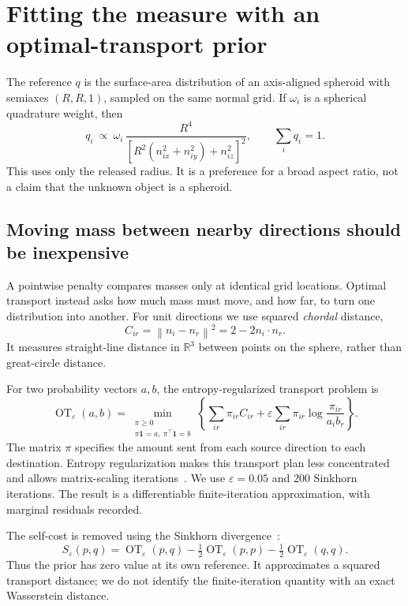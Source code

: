 \documentclass[11pt,a4paper]{article}
\newcommand{\R}{\mathbb{R}}
\newcommand{\norm}[1]{\left\lVert#1\right\rVert}
\newcommand{\OT}{\operatorname{OT}}
\begin{document}
\clearpage
\section{Fitting the measure with an optimal-transport prior}
The reference $q$ is the surface-area distribution of an axis-aligned spheroid with semiaxes $(R,R,1)$, sampled on the same normal grid. If $\omega_i$ is a spherical quadrature weight, then
\begin{equation}
 q_i\ \propto\ \omega_i\,
 \frac{R^4}{\left[R^2(n_{ix}^2+n_{iy}^2)+n_{iz}^2\right]^2},
 \qquad \sum_i q_i=1.\label{eq:reference}
\end{equation}
This uses only the released radius. It is a preference for a broad aspect ratio, not a claim that the unknown object is a spheroid.

\subsection*{Moving mass between nearby directions should be inexpensive}
A pointwise penalty compares masses only at identical grid locations. Optimal transport instead asks how much mass must move, and how far, to turn one distribution into another. For unit directions we use squared \emph{chordal} distance,
\begin{equation}
 C_{ir}=\norm{n_i-n_r}^{2}=2-2n_i\cdot n_r.
\end{equation}
It measures straight-line distance in $\R^3$ between points on the sphere, rather than great-circle distance.

For two probability vectors $a,b$, the entropy-regularized transport problem is
\begin{equation}
 \OT_\varepsilon(a,b)=\min_{\substack{\pi\geq0\\\pi\mathbf1=a,\ \pi^\top\mathbf1=b}}
 \left\{\sum_{ir}\pi_{ir}C_{ir}
 +\varepsilon\sum_{ir}\pi_{ir}\log\frac{\pi_{ir}}{a_i b_r}\right\}.
 \label{eq:ot}
\end{equation}
The matrix $\pi$ specifies the amount sent from each source direction to each destination. Entropy regularization makes this transport plan less concentrated and allows matrix-scaling iterations~\cite{cuturi2013}. We use $\varepsilon=0.05$ and $200$ Sinkhorn iterations. The result is a differentiable finite-iteration approximation, with marginal residuals recorded.

The self-cost is removed using the Sinkhorn divergence~\cite{feydy2019}:
\begin{equation}
 S_\varepsilon(p,q)=\OT_\varepsilon(p,q)
 -\tfrac12\OT_\varepsilon(p,p)-\tfrac12\OT_\varepsilon(q,q).
 \label{eq:sinkhorn}
\end{equation}
Thus the prior has zero value at its own reference. It approximates a squared transport distance; we do not identify the finite-iteration quantity with an exact Wasserstein distance.
\end{document}
